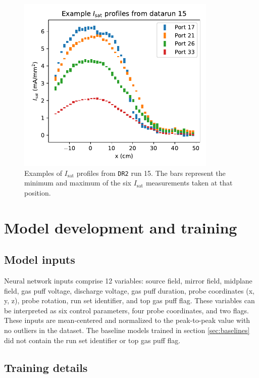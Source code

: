 \begin{figure}
	\centering
	\includegraphics[width=270pt]{figures/PP1_isat_example_bars.pdf}
	\caption[Examples of $I_\text{sat}$ profiles from \texttt{DR2}]{\label{fig:PP1_isat_example}Examples of $I_\text{sat}$ profiles from \texttt{DR2} run 15. The bars represent the minimum and maximum of the six $I_\text{sat}$ measurements taken at that position. }
\end{figure}

\section{Model development and training}
\label{sec:model_dev}

\subsection{Model inputs}

Neural network inputs comprise 12 variables: source field, mirror field, midplane field, gas puff voltage, discharge voltage, gas puff duration, probe coordinates (x, y, z), probe rotation, run set identifier, and top gas puff flag. These variables can be interpreted as six control parameters, four probe coordinates, and two flags. These inputs are mean-centered and normalized to the peak-to-peak value with no outliers in the dataset. The baseline models trained in section \ref{sec:baselines} did not contain the run set identifier or top gas puff flag.

\subsection{Training details}

